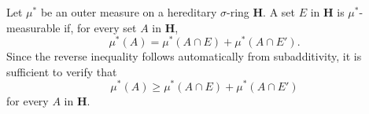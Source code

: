 Let $\mu^*$ be an outer measure on a hereditary $\sigma$-ring $\mathbf{H}$. A set $E$ in $\mathbf{H}$ is $\mu^*$-measurable if, for every set $A$ in $\mathbf{H}$,
$$\mu^*(A) = \mu^*(A \cap E) + \mu^*(A \cap E').$$
Since the reverse inequality follows automatically from subadditivity, it is sufficient to verify that
$$\mu^*(A) \geq \mu^*(A \cap E) + \mu^*(A \cap E')$$
for every $A$ in $\mathbf{H}$.
